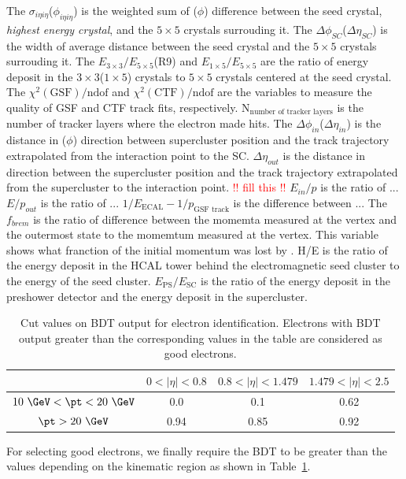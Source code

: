 The $\sigma_{i\eta i\eta}$($\phi_{i\eta i\eta}$) is the weighted sum of \Eta($\phi$) 
difference between the seed crystal, \textit{highest energy crystal}, 
and the $5\times5$ crystals surrouding it.
The $\Delta \phi_{SC}$($\Delta \eta_{SC}$) is the width of average distance 
between the seed crystal and the $5\times5$ crystals surrouding it.
The $E_{3\times3}/E_{5\times5}$(R9) and $E_{1\times5}/E_{5\times5}$ 
are the ratio of energy deposit in the $3\times3$($1\times5$) crystals to 
$5\times5$ crystals centered at the seed crystal. 
The $\chi^2(\textrm{GSF})/\textrm{ndof}$ and $\chi^2(\textrm{CTF})/\textrm{ndof}$
are the variables to measure the quality of GSF and CTF track fits, respectively. 
$\textrm{N}_\textrm{number of tracker layers}$ is the number of tracker layers 
where the electron made hits. 
The $\Delta \phi_{in}$($\Delta \eta_{in}$) is the distance in \Eta($\phi$) direction 
between supercluster position and the track trajectory extrapolated from the interaction point
to the SC. $\Delta \eta_{out}$ is the distance in \Eta{} direction
between the supercluster position and the track trajectory extrapolated 
from the supercluster to the interaction point.
\textcolor{red}{  !! fill this !!} 
$E_{in}/p$ is the ratio of  ... 
$E/p_{out}$ is the ratio of  ... 
$1/E_\textrm{ECAL} - 1/p_{\textrm{GSF track}}$ is the difference between ... 
The $f_{brem}$ is the ratio of difference between the momemta measured 
at the vertex and the outermost state to the momemtum measured at the 
vertex. This variable shows what franction of the initial momentum  
was lost by \brem{}. 
H/E is the ratio of the energy deposit in the HCAL tower behind the electromagnetic 
seed cluster to the energy of the seed cluster.
$E_{\textrm{PS}}/E_{\textrm{SC}}$ is the ratio of the energy deposit in the preshower 
detector and the energy deposit in the supercluster. 
\begin{table}[!ht]
  \centering 
  \begin{tabular} {c||c|c|c}
  \hline
        & $0<|\eta|<0.8$ & $0.8<|\eta|<1.479$ & $1.479<|\eta|<2.5$\\
  \hline \hline
   $10~\GeV<\pt<20~\GeV$    & 0.0   & 0.1   & 0.62 \\ 
  \hline
   $\pt>20~\GeV$            & 0.94  & 0.85  & 0.92 \\ 
  \hline 
  \end{tabular}
  \caption{Cut values on BDT output for electron identification. Electrons with BDT output
  greater than the corresponding values in the table are considered as good electrons.} 
  \label{tab:electronid_bdtcut}
\end{table}
For selecting good electrons, we finally require the BDT to be greater 
than the values depending on the kinematic region as shown in Table~\ref{tab:electronid_bdtcut}. 

